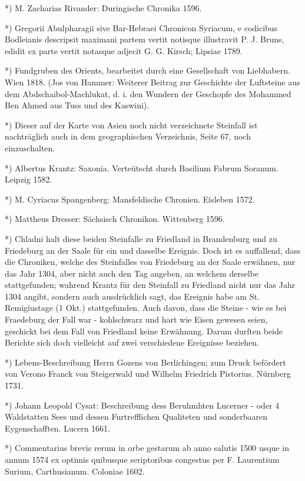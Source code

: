 \documentclass[a4paper, 11pt, oneside, polutonikogreek, german]{article}
\begin{document}
*) M. Zacharias Rivander: Duringische Chronika 1596.

*) Gregorii Abulpharagii sive Bar-Hebraei Chronicon Syriacum, e codicibus Bodleianis descripsit maximani partem vertit notisque illustravit P. J. Bruns, edidit ex parte vertit notasque adjecit G. G. Kirsch; Lipsiae 1789.

*) Fundgruben des Orients, bearbeitet durch eine Gesellschaft von Liebhabern. Wien 1818. (Jos von Hammer: Weiterer Beitrag zur Geschichte der Luftsteine aus dem Abdschaibol-Machlukat, d. i. den Wundern der Geschopfe des Mohammed Ben Ahmed aus Tuss und des Kaswini).

*) Dieser auf der Karte von Asien noch nicht verzeichnete Steinfall ist nachträglich auch in dem geographischen Verzeichnis, Seite 67, noch einzuschalten.

*) Albertus Krantz: Saxonia. Verteütscht durch Basilium Fabrum Soranum. Leipzig 1582.

*) M. Cyriacus Spangenberg: Mansfeldische Chronien. Eisleben 1572.

*) Mattheus Dresser: Sächsisch Chronikon. Wittenberg 1596.

*) Chladni halt diese beiden Steinfalle zu Friedland in Brandenburg und zu Friedeburg an der Saale für ein und dasselbe Ereignis. Doch ist es auffallend, dass die Chroniken, welche des Steinfalles von Friedeburg an der Saale erwähnen, nur das Jahr 1304, aber nicht auch den Tag angeben, an welchem derselbe stattgefunden; wahrend Krantz für den Steinfall zu Friedland nicht nur das Jahr 1304 angibt, sondern auch ausdrücklich sagt, das Ereignis habe am St. Remigiustage (1 Okt.) stattgefunden. Auch davon, dass die Steine - wie es bei Fraedeburg der Fall war - kohlschwarz und hart wie Eisen gewesen seien, geschickt bei dem Fall von Friedland keine Erwähnung. Darum durften beide Berichte sich doch vielleicht auf zwei verschiedene Ereignisse beziehen.

*) Lebens-Beschreibung Herrn Gozens von Berlichingen; zum Druck befördert von Verono Franck von Steigerwald und Wilhelm Friedrich Pistorius. Nürnberg 1731.

*) Johann Leopold Cysat: Beschreibung dess Beruhmhten Lucerner - oder 4 Waldstatten Sees und dessen Furtrefflichen Qualiteten und sonderbaaren Eygenschafften. Lucern 1661.

*) Commentarius brevis rerum in orbe gestarum ab anno salutis 1500 usque in annum 1574 ex optimis quibusque seriptoribus congestus per F. Laurentium Surium, Carthusianum. Coloniae 1602.
\end{document}
